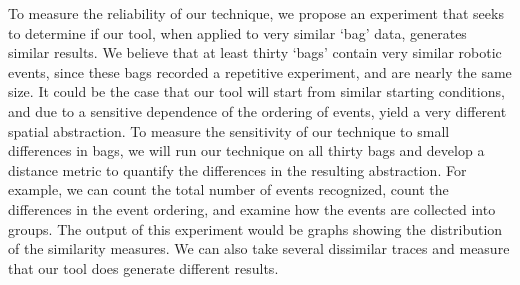 To measure the reliability of our technique, we propose an experiment that seeks to determine if our tool, when applied to very similar `bag' data, generates similar results.
We believe that at least thirty `bags' contain very similar robotic events, since these bags recorded a repetitive experiment, and are nearly the same size.
It could be the case that our tool will start from similar starting conditions, and due to a sensitive dependence of the ordering of events, yield a very different spatial abstraction.
To measure the sensitivity of our technique to small differences in bags, we will run our technique on all thirty bags and develop a distance metric to quantify the differences in the resulting abstraction.
For example, we can count the total number of events recognized, count the differences in the event ordering, and examine how the events are collected into groups.
The output of this experiment would be graphs showing the distribution of the similarity measures.
We can also take several dissimilar traces and measure that our tool does generate different results.




